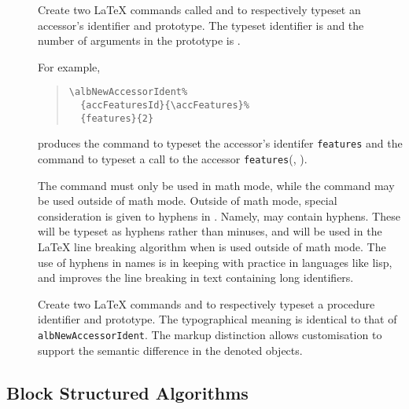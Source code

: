\documentclass[11pt,a4paper,oneside,titlepage]{alb-corp}
\begin{document}
\begin{description}
\item[%
  ] Create two \LaTeX{} commands called  and
   to respectively typeset an accessor's identifier
  and prototype.  The typeset identifier is  and the
  number of arguments in the prototype is .

  For example,
  \begin{quote}
\begin{verbatim}
\albNewAccessorIdent%
  {accFeaturesId}{\accFeatures}%
  {features}{2}
\end{verbatim}
  \end{quote}
  produces the command  to typeset the
  accessor's identifer \texttt{features} and the command
   to typeset a
  call to the accessor \texttt{features}(,
  ).

  The  command must only be used in math mode, while
  the  command may be used outside of math mode.
  Outside of math mode, special consideration is given to hyphens in
  .  Namely,  may contain hyphens.
  These will be typeset as hyphens rather than minuses, and will be used
  in the \LaTeX{} line breaking algorithm when  is
  used outside of math mode.  The use of hyphens in names is in keeping
  with practice in languages like lisp, and improves the line breaking
  in text containing long identifiers.

\item[%
  ] Create two \LaTeX{} commands  and
   to respectively typeset a procedure identifier and
  prototype.  The typographical meaning is identical to that of
  \texttt{albNewAccessorIdent}.  The markup distinction allows \AUCTeX{}
  customisation to support the semantic difference in the denoted
  objects.
\end{description}



\subsection{Block Structured Algorithms}
\label{sec:alb-algorithms-documentation:block-struct-algor}
\end{document}
